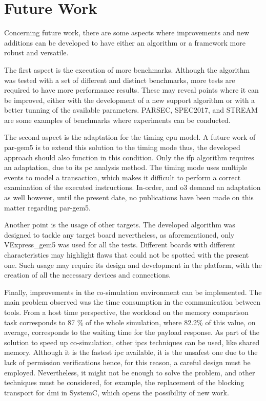\section{Future Work}

Concerning future work, there are some aspects where improvements and new additions can be developed to have either an 
algorithm or a framework more robust and versatile.

The first aspect is the execution of more benchmarks. Although the algorithm was tested with a set of different and distinct benchmarks, 
more tests are required to have more performance results. These may reveal points where it can be improved, either with the development
of a new support algorithm or with a better tunning of the available parameters. PARSEC, SPEC2017, and STREAM are some examples of 
benchmarks where experiments can be conducted. 

The second aspect is the adaptation for the timing \gls{cpu} model. A future work of par-gem5 \cite{pargem5} is to extend this solution 
to the timing mode thus, the developed approach should also function in this condition. Only the \gls{ifp} algorithm requires an 
adaptation, due to its \gls{pc} analysis method. The timing mode uses multiple events to model a transaction, which makes it difficult
to perform a correct examination of the executed instructions. In-order, and \gls{o3} demand an adaptation as well however, until 
the present date, no publications have been made on this matter regarding par-gem5.

Another point is the usage of other targets. The developed algorithm was designed to tackle any target board nevertheless, as 
aforementioned, only VExpress\_gem5 was used for all the tests. Different boards with different characteristics may highlight flaws
that could not be spotted with the present one. Such usage may require its design and development in the platform, 
with the creation of all the necessary devices and connections. 

Finally, improvements in the co-simulation environment can be implemented. The main problem observed was the time consumption in the 
communication between tools. From a host time perspective, the workload on the memory comparison task corresponds to 87 \% of the 
whole simulation, where 82.2\% of this value, on average, corresponds to the waiting time for the payload response. As part of the solution
to speed up co-simulation, other \glspl*{ipc} techniques can be used, like shared memory. Although it is the 
fastest \gls{ipc} available, it is the unsafest one due to the lack of permission verifications hence, for this reason, a careful 
design must be employed. Nevertheless, it might not be enough to solve the problem, and other techniques must be considered, for example, 
the replacement of the blocking transport for \gls{dmi} in SystemC, which opens the possibility of new work. 

